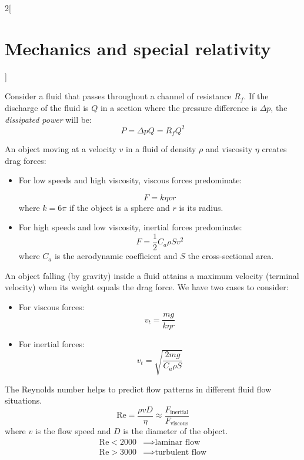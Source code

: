 \documentclass[../../../main.tex]{subfiles}
\begin{document}
\begin{multicols}{2}[\section{Mechanics and special relativity}]
\begin{proposition}
    Consider a fluid that passes throughout a channel of resistance $R_f$. If the discharge of the fluid is $Q$ in a section where the pressure difference is $\Delta p$, the \emph{dissipated power} will be:
    $$P=\Delta pQ=R_fQ^2$$
  \end{proposition}
  \begin{proposition}
    An object moving at a velocity $v$ in a fluid of density $\rho$ and viscosity $\eta$ creates drag forces:
    \begin{itemize}
      \item For low speeds and high viscosity, viscous forces predominate:\par
            $$F=k\eta vr$$
            where $k=6\pi$ if the object is a sphere and $r$ is its radius.
      \item For high speeds and low viscosity, inertial forces predominate:
            $$F=\frac{1}{2}C_a\rho Sv^2$$
            where $C_a$ is the aerodynamic coefficient and $S$ the cross-sectional area.
    \end{itemize}
  \end{proposition}
  \begin{proposition}
    An object falling (by gravity) inside a fluid attains a maximum velocity (terminal velocity) when its weight equals the drag force. We have two cases to consider:
    \begin{itemize}
      \item For viscous forces: $$v_t=\frac{mg}{k\eta r}$$
      \item For inertial forces: $$v_t=\sqrt{\frac{2mg}{C_a\rho S}}$$
    \end{itemize}
  \end{proposition}
  \begin{proposition}
    The Reynolds number helps to predict flow patterns in different fluid flow situations.
    $$\text{Re}=\frac{\rho vD}{\eta}\approx\frac{F_{\text{inertial}}}{F_{\text{viscous}}}$$
    where $v$ is the flow speed and $D$ is the diameter of the object.
    \begin{align*}
      \text{Re}<2000 & \implies\text{laminar flow}   \\
      \text{Re}>3000 & \implies\text{turbulent flow}
    \end{align*}
  \end{proposition}


\end{multicols}
\end{document}
